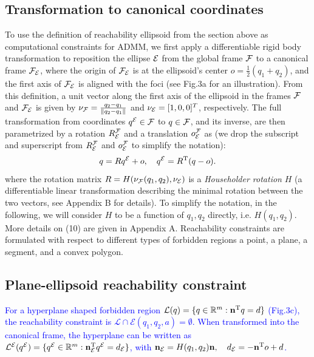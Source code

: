 \documentclass{article}
\newcommand{\new}[1]{\textcolor{blue}{#1}}
\newcommand{\news}{\color{blue}}
\begin{document}
 \subsection{Transformation to canonical coordinates}\label{sec:rotation2Standard}
{\news	\newcommand{\oFE}{o}
 To use the definition of reachability ellipsoid from the section above as computational constraints for ADMM, we first apply a differentiable rigid body transformation to reposition the ellipse $\mathcal{E}$ from the global frame $\mathcal{F}$ to a canonical frame $\mathcal{F}_{\mathcal{E}}$, where the origin of $\mathcal{F}_{\mathcal{E}}$ is at the ellipsoid's center $\oFE = \frac{1}{2}(q_1+q_2)$, and the first axis of $\mathcal{F}_{\mathcal{E}}$ is aligned with the foci (see Fig.3a for an illustration). 
From this definition, a unit vector along the first axis of the ellipsoid in the frames $\mathcal{F}$ and $\mathcal{F}_{\mathcal{E}}$ is given by $\nu_{\mathcal{F}} = \frac{q_2-q_1}{\lVert q_2-q_1\rVert}$ and $\nu_{\mathcal{E}} =[1,0,0]^T$, respectively.
The full transformation from coordinates $q^{\mathcal{E}}\in\mathcal{F}$ to $q\in\mathcal{F}$, and its inverse, are then parametrized by a rotation $R^{\mathcal{F}}_{\mathcal{E}}$ and a translation $o^{\mathcal{F}}_{\mathcal{E}}$ as (we drop the subscript and superscript from $R^{\mathcal{F}}_{\mathcal{E}}$ and $o^{\mathcal{F}}_{\mathcal{E}}$ to simplify the notation):
\setcounter{equation}{9}
\begin{equation}\label{eq:transformations}
  q=R\Eframe{q}+\oFE,\quad
  \Eframe{q}=R\transpose(q-\oFE).
\end{equation}
where the rotation matrix $R=H(\nu_{\mathcal{F}}(q_1,q_2),\nu_{\mathcal{E}})$ is a \emph{Householder rotation} $H$ (a differentiable linear transformation describing the minimal rotation between the two vectors, see Appendix B for details).  To simplify the notation, in the following, we will consider $H$ to be a function of $q_1,q_2$ directly, i.e. $H(q_1,q_2)$. More details on (10) are given in Appendix A.
  Reachability constraints are formulated with respect to different types of forbidden regions a point, a plane, a segment, and a convex polygon.}
\renewcommand\thesubsection{F}
\subsection{Plane-ellipsoid reachability constraint}\label{sec:ellipsoide-plane}
\new{For a hyperplane shaped forbidden region $\mathcal{L}(q) = \{q\in\mathbb{R}^m: \mathbf{n}^\mathrm{T} q = d\}$ (Fig.3c), the reachability constraint is $\mathcal{L} \cap \mathcal{E}(q_1,q_2,a) = \emptyset$. When transformed into the canonical frame, the hyperplane can be written as ${\mathcal{L}^{\mathcal{E}}}({q^{\mathcal{E}}}) = \{  {q^{\mathcal{E}}}\in\mathbb{R}^m:  \mathbf{n}_{\mathcal{E}}^\mathrm{T} {q^{\mathcal{E}}} = d_{\mathcal{E}}\}$, with $\mathbf{n}_{\mathcal{E}} = H(q_1,q_2)\mathbf{n}, \quad d_{\mathcal{E}} =-\mathbf{n}^\mathrm{T} o + d$.}
\renewcommand\thesubsection{G}
\def\sZ{\mathcal{Z}}
\end{document}

